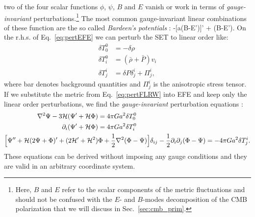 two of the four scalar functions $\phi$, $\psi$, $B$ and $E$ vanish or work in terms of \emph{gauge-invariant} 
perturbations.\footnote{Here, $B$ and $E$ refer to the scalar components of the metric fluctuations and should not be confused with the $E$- and $B$-modes decomposition of the \gls{CMB} polarization that we will discuss in Sec.~\eqref{sec:cmb_prim}.} The most common  gauge-invariant linear combinations of these function are the so called
\emph{Bardeen's potentials} \citep{Bardeen1980,Mukhanov1992}:
%
\be
\Phi \equiv \phi -[a(B-E')]' \quad {} \quad \Psi \equiv \psi + (B-E').
\ee
%
On the r.h.s. of Eq.~\eqref{eq:pertEFE} we can perturb the \gls{SET} to linear order like:
%
\begin{align}
\label{eq:pertSET}
\delta T^0_0 &= -\delta\rho \\ 
\delta T^0_i &= (\bar{\rho} + \bar{P})v_i \\ 
\delta T^i_j &= \delta P\delta^i_j + \Pi^i_j,
\end{align}
%
where bar denotes background quantities and $\Pi^i_j$ is the anisotropic stress tensor.
If we substitute the metric from Eq.~\eqref{eq:pertFLRW} into \gls{EFE} and keep only the linear order 
perturbations, we find the \emph{gauge-invariant} perturbation equations \citep{Mukhanov2005}:
%
\begin{align}
\label{eq:pertEFE2}
\nabla^2\Psi - 3\mathcal{H}(\Psi' + \mathcal{H}\Phi) &= 4\pi Ga^2\delta T^0_0 \\
\partial_i(\Psi'+\mathcal{H}\Phi) &= 4\pi G a^2\delta T^0_i \\
\Bigl [\Psi''+\mathcal{H}(2\Psi+\Phi)' + (2\mathcal{H}'+\mathcal{H}^2)&\Phi +\frac{1}{2}\nabla^2(\Phi-\Psi) \Bigr]\delta_{ij} - \frac{1}{2} \partial_i\partial_j(\Phi-\Psi) = -4\pi G a^2 \delta T^i_j.
\end{align}
%
These equations can be derived without imposing any gauge conditions and they are valid in an arbitrary coordinate system. 

